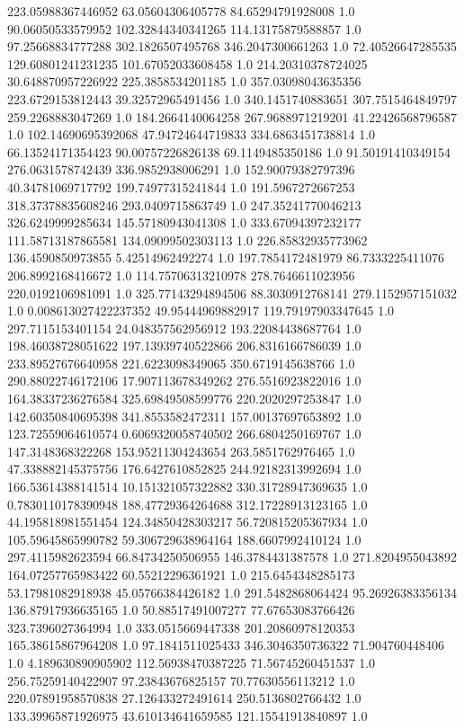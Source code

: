223.05988367446952	63.05604306405778	84.65294791928008	1.0
90.06050533579952	102.32844340341265	114.13175879588857	1.0
97.25668834777288	302.1826507495768	346.2047300661263	1.0
72.40526647285535	129.60801241231235	101.67052033608458	1.0
214.20310378724025	30.648870957226922	225.3858534201185	1.0
357.03098043635356	223.6729153812443	39.32572965491456	1.0
340.1451740883651	307.7515464849797	259.2268883047269	1.0
184.2664140064258	267.9688971219201	41.22426568796587	1.0
102.14690695392068	47.94724644719833	334.6863451738814	1.0
66.13524171354423	90.00757226826138	69.1149485350186	1.0
91.50191410349154	276.0631578742439	336.9852938006291	1.0
152.90079382797396	40.34781069717792	199.74977315241844	1.0
191.5967272667253	318.37378835608246	293.0409715863749	1.0
247.35241770046213	326.6249999285634	145.57180943041308	1.0
333.67094397232177	111.58713187865581	134.09099502303113	1.0
226.85832935773962	136.4590850973855	5.42514962492274	1.0
197.7854172481979	86.7333225411076	206.8992168416672	1.0
114.75706313210978	278.7646611023956	220.0192106981091	1.0
325.77143294894506	88.3030912768141	279.1152957151032	1.0
0.008613027422237352	49.95444969882917	119.79197903347645	1.0
297.7115153401154	24.048357562956912	193.22084438687764	1.0
198.46038728051622	197.13939740522866	206.8316166786039	1.0
233.89527676640958	221.6223098349065	350.6719145638766	1.0
290.88022746172106	17.907113678349262	276.5516923822016	1.0
164.38337236276584	325.69849508599776	220.2020297253847	1.0
142.60350840695398	341.8553582472311	157.00137697653892	1.0
123.72559064610574	0.6069320058740502	266.6804250169767	1.0
147.3148368322268	153.95211304243654	263.5851762976465	1.0
47.338882145375756	176.6427610852825	244.92182313992694	1.0
166.53614388141514	10.151321057322882	330.31728947369635	1.0
0.7830110178390948	188.47729364264688	312.17228913123165	1.0
44.195818981551454	124.34850428303217	56.720815205367934	1.0
105.59645865990782	59.306729638964164	188.6607992410124	1.0
297.4115982623594	66.84734250506955	146.3784431387578	1.0
271.8204955043892	164.07257765983422	60.55212296361921	1.0
215.6454348285173	53.17981082918938	45.05766384426182	1.0
291.5482868064424	95.26926383356134	136.87917936635165	1.0
50.88517491007277	77.67653083766426	323.7396027364994	1.0
333.0515669447338	201.20860978120353	165.38615867964208	1.0
97.1841511025433	346.3046350736322	71.904760448406	1.0
4.189630890905902	112.56938470387225	71.56745260451537	1.0
256.75259140422907	97.23843676825157	70.77630556113212	1.0
220.07891958570838	27.126433272491614	250.5136802766432	1.0
133.39965871926975	43.610134641659585	121.15541913840897	1.0
